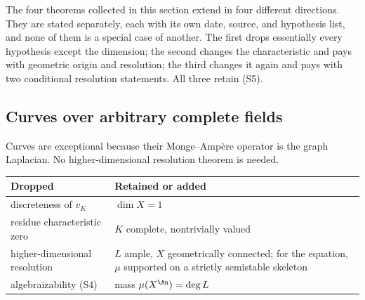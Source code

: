 The four theorems collected in this section extend
 in four different directions.
They are stated separately, each with its own date, source, and hypothesis
list, and none of them is a special case of another.  The first drops
essentially every hypothesis except the dimension; the second changes the
characteristic and pays with geometric origin and resolution; the third
changes it again and pays with two conditional resolution statements.  All
three retain \textup{(S5)}.

\subsection{Curves over arbitrary complete fields}
\label{sec:ch29-later-curves}

Curves are exceptional because their Monge--Amp\`ere operator is the graph
Laplacian.  No higher-dimensional resolution theorem is needed.

\begin{center}
\small
\begin{tabular}{p{}|p{}}
\toprule
\textbf{Dropped}&\textbf{Retained or added}\\
\midrule
discreteness of \(v_K\)
 &\(\dim X=1\)\\
residue characteristic zero
 &\(K\) complete, nontrivially valued\\
higher-dimensional resolution
 &\(L\) ample, \(X\) geometrically connected; for the equation,
  \(\mu\) supported on a strictly semistable skeleton\\
algebraizability \textup{(S4)}
 &mass \(\mu(X^{\An})=\deg L\)\\
\bottomrule
\end{tabular}
\end{center}


